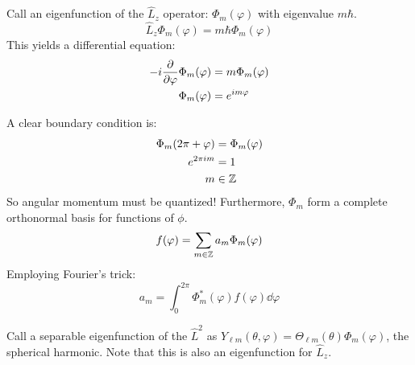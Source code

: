 Call an eigenfunction of the $\hat{L}_z$ operator: $\Phi_m(\varphi)$ with eigenvalue $m \hbar$.
\[ \hat{L}_z \Phi_m(\varphi) = m \hbar \Phi_m(\varphi) \]
This yields a differential equation:
\begin{align*}
    -i \pdv{}{\varphi} \Phi_m(\varphi) &= m \Phi_m(\varphi) \\
    \Phi_m(\varphi) &= e^{im\varphi}
\end{align*}

A clear boundary condition is:
\begin{align*}
    \Phi_m(2\pi + \varphi) &= \Phi_m(\varphi) \\
    e^{2\pi i m} &= 1 \\
    m &\in \operatorname{\mathbb{Z}}
\end{align*}
So angular momentum must be quantized! Furthermore, $\Phi_m$ form a complete orthonormal basis for functions of $\phi$.
\[ f(\varphi) = \sum_{m \in \operatorname{\mathbb{Z}}} a_m \Phi_m(\varphi) \]
Employing Fourier's trick:
\[ a_m = \int_{0}^{2\pi} \Phi_{m}^* (\varphi) f(\varphi) \dd{\varphi} \]

Call a separable eigenfunction of the $\hat{L}^2$ as $Y_{\ell m}(\theta, \varphi) = \Theta_{\ell m}(\theta) \Phi_m(\varphi)$, the spherical harmonic. Note that this is
also an eigenfunction for $\hat{L}_z$.

